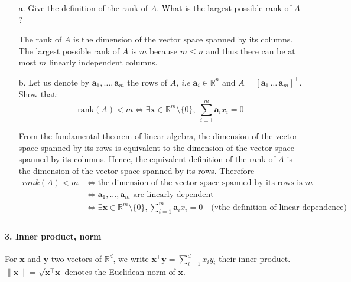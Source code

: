 \documentclass[11pt]{article}
\newcommand{\R}{\mathbb{R}}                     %
\newcommand{\bx}{\mathbf{x}}
\newcommand{\by}{\mathbf{y}}
\newcommand{\ba}{\mathbf{a}}
\begin{document}
\begin{itemize}
\item[a.] Give the definition of the rank of $A$. What is the largest possible
    rank of $A$?
    
\color{blue}
The rank of $A$ is the dimension of the vector space spanned by its columns. The largest possible rank of $A$ is $m$ because $m\leq n$ and thus there can be at most $m$ linearly independent columns.
\color{black}

\item[b.] Let us denote by $\ba_1,\dots, \ba_m$ the rows of $A$, \emph{i.e}
$\ba_i\in \R^n$ and $A = [\ba_1\, \dots\, \ba_m]^\intercal$.
Show that:
\begin{displaymath}
    \text{rank}(A) < m \Leftrightarrow \exists \bx\in \R^m\setminus\{0\},\;
    \sum_{i=1}^m \ba_i x_i = 0
\end{displaymath}

\color{blue}
From the fundamental theorem of linear algebra, the dimension of the vector space spanned by its rows is equivalent to the dimension of the vector space spanned by its columns. Hence, the equivalent definition of the rank of $A$ is the dimension of the vector space spanned by its rows. Therefore
\begin{align*}
rank(A) < m &\Leftrightarrow \text{the dimension of the vector space spanned by its rows is less than $m$}&\\
&\Leftrightarrow \text{$\ba_1,...,\ba_m$ are linearly dependent} &\\
&\Leftrightarrow \exists \bx \in \mathbb{R}^m \setminus \{0\}, \sum_{i=1}^m \ba_i x_i=0 \quad (\because \text{the definition of linear dependence)}&\\
\end{align*}
\color{black}

\end{itemize}

\paragraph{3. Inner product, norm}

For $\bx$ and $\by$ two vectors of $\R^d$, we write $\bx^\intercal \by
= \sum_{i=1}^d x_iy_i$ their inner product. $\|\bx\| = \sqrt{\bx^\intercal
\bx}$ denotes the Euclidean norm of $\bx$.
\end{document}
